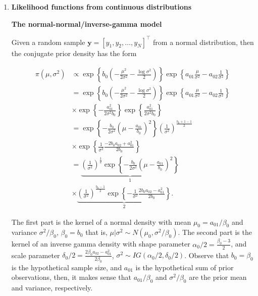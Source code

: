 \begin{enumerate}
\item \textbf{Likelihood functions from continuous distributions}

\textbf{The normal-normal/inverse-gamma model}

Given a random sample $\mathbf{y}=[y_1,y_2,\dots,y_N]^{\top}$ from a normal distribution, then the conjugate prior density has the form 

\begin{align}
	\pi(\mu,\sigma^2)&\propto \exp\left\{b_0\left(-\frac{\mu^2}{2\sigma^2}-\frac{\log \sigma^2}{2}\right)\right\}\exp\left\{a_{01}\frac{\mu}{\sigma^2}-a_{02}\frac{1}{\sigma^2}\right\}\nonumber\\
	&=\exp\left\{b_0\left(-\frac{\mu^2}{2\sigma^2}-\frac{\log \sigma^2}{2}\right)\right\}\exp\left\{a_{01}\frac{\mu}{\sigma^2}-a_{02}\frac{1}{\sigma^2}\right\}\nonumber\\
	&\times \exp\left\{-\frac{a_{01}^2}{2\sigma^2b_0}\right\}\exp\left\{\frac{a_{01}^2}{2\sigma^2b_0}\right\}\nonumber\\
	&=\exp\left\{-\frac{b_0}{2\sigma^2}\left(\mu-\frac{a_{01}}{b_0}\right)^2\right\}\left(\frac{1}{\sigma^2}\right)^{\frac{b_0+1-1}{2}}\nonumber\\
	&\times \exp\left\{\frac{1}{\sigma^2}\frac{-2b_0a_{02}+a_{01}^2}{2b_0}\right\}\nonumber\\
	&=\underbrace{\left(\frac{1}{\sigma^2}\right)^{\frac{1}{2}}\exp\left\{-\frac{b_0}{2\sigma^2}\left(\mu-\frac{a_{01}}{b_0}\right)^2\right\}}_{1}\nonumber\\
	&\times\underbrace{\left(\frac{1}{\sigma^2}\right)^{\frac{b_0-1}{2}}\exp\left\{-\frac{1}{\sigma^2}\frac{2b_0a_{02}-a_{01}^2}{2b_0}\right\}}_{2}.\nonumber
\end{align}

The first part is the kernel of a normal density with mean $\mu_0=a_{01}/\beta_0$ and variance $\sigma^2/\beta_0$, $\beta_0=b_0$ that is, $\mu|\sigma^2\sim N(\mu_0,\sigma^2/\beta_0)$. The second part is the kernel of an inverse gamma density with shape parameter $\alpha_0/2=\frac{\beta_0-3}{2}$, and scale parameter $\delta_0/2=\frac{2\beta_0a_{02}-a_{01}^2}{2\beta_0}$, $\sigma^2\sim IG(\alpha_0/2,\delta_0/2)$. Observe that $b_0=\beta_0$ is the hypothetical sample size, and $a_{01}$ is the hypothetical sum of prior observations, then, it makes sense that $a_{01}/\beta_0$ and $\sigma^2/\beta_0$ are the prior mean and variance, respectively. 


\end{enumerate}
